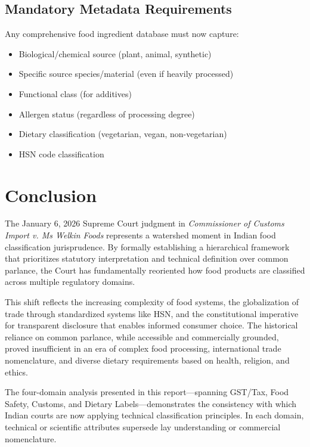 \documentclass[12pt,a4paper]{article}
\begin{document}
\subsection{Mandatory Metadata Requirements}

Any comprehensive food ingredient database must now capture:

\begin{itemize}
\item Biological/chemical source (plant, animal, synthetic)
\item Specific source species/material (even if heavily processed)
\item Functional class (for additives)
\item Allergen status (regardless of processing degree)
\item Dietary classification (vegetarian, vegan, non-vegetarian)
\item HSN code classification
\end{itemize}

\section{Conclusion}

The January 6, 2026 Supreme Court judgment in \textit{Commissioner of Customs Import v. Ms Welkin Foods} represents a watershed moment in Indian food classification jurisprudence. By formally establishing a hierarchical framework that prioritizes statutory interpretation and technical definition over common parlance, the Court has fundamentally reoriented how food products are classified across multiple regulatory domains.

This shift reflects the increasing complexity of food systems, the globalization of trade through standardized systems like HSN, and the constitutional imperative for transparent disclosure that enables informed consumer choice. The historical reliance on common parlance, while accessible and commercially grounded, proved insufficient in an era of complex food processing, international trade nomenclature, and diverse dietary requirements based on health, religion, and ethics.

The four-domain analysis presented in this report---spanning GST/Tax, Food Safety, Customs, and Dietary Labels---demonstrates the consistency with which Indian courts are now applying technical classification principles. In each domain, technical or scientific attributes supersede lay understanding or commercial nomenclature.
\end{document}
